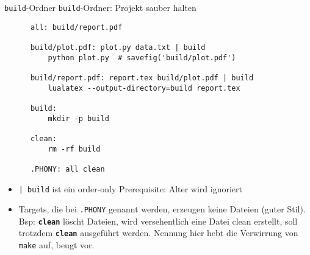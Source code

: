
\begin{frame}[fragile]{\texttt{build}-Ordner}
  \texttt{build}-Ordner: Projekt sauber halten

  \begin{center}
    \begin{verbatim}
      all: build/report.pdf

      build/plot.pdf: plot.py data.txt | build
          python plot.py  # savefig('build/plot.pdf')

      build/report.pdf: report.tex build/plot.pdf | build
          lualatex --output-directory=build report.tex

      build:
          mkdir -p build

      clean:
          rm -rf build

      .PHONY: all clean
    \end{verbatim}
  \end{center}

  \begin{itemize}
    \item \texttt{| build} ist ein order-only Prerequisite: Alter wird ignoriert
    \item Targets, die bei \texttt{.PHONY} genannt werden, erzeugen keine Dateien (guter Stil).
        Bsp: \textbf{\texttt{clean}} löscht Dateien, wird versehentlich eine Datei clean erstellt,
        soll trotzdem \textbf{\texttt{clean}} ausgeführt werden.
        Nennung hier hebt die Verwirrung von \texttt{make} auf, beugt vor.
  \end{itemize}
\end{frame}


